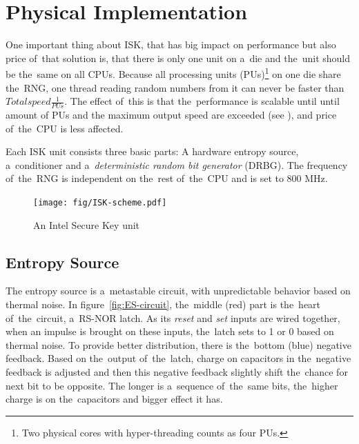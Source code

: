\section{Physical Implementation}\label{sec:ISK-physical}
One important thing about ISK, that has big impact on performance but also price of~that solution is, that there is only one unit on a~die and the~unit should be the~same on all CPUs. %
Because all processing units (PUs)\footnote{Two physical cores with hyper-threading counts as four PUs.} on one die share the~RNG, one thread reading random numbers from it can never be faster than $Total speed  \frac{1}{PUs}$. The effect of~this is that the~performance is scalable until until amount of PUs and the maximum output speed are exceeded (see ), and price of~the~CPU is less affected.

Each ISK unit consists three basic parts: A hardware entropy source, a~conditioner and a~{\em deterministic random bit generator} (DRBG)\cite{IntelDRNGGuide}. The frequency of~the~RNG is independent on the~rest of~the~CPU and is set to 800 MHz. 
\begin{figure}[h!]
  \centering
 \texttt{[image: fig/ISK-scheme.pdf]} %
\caption{An Intel Secure Key unit}
\label{fig:ISK-unit}
\end{figure}


\subsection{Entropy Source}

The entropy source is a~metastable circuit, with unpredictable behavior based 
on thermal noise\cite{UnderstandingRdRandElectronic}. 
In figure~\ref{fig:ES-circuit}, the~middle (red) part is the~heart 
of~the~circuit, a~RS-NOR latch. As its {\em reset} and {\em set} inputs 
are wired together, when an impulse is brought on these inputs, the~latch sets 
to 1 or 0 based on thermal noise. To provide better distribution, there is 
the~bottom (blue) negative feedback. Based on the~output of~the~latch, charge 
on capacitors in the~negative feedback is adjusted and then this negative 
feedback slightly shift the~chance for next bit to be opposite. The longer 
is a~sequence of~the~same bits, the~higher charge is on the~capacitors 
and bigger effect it has.

